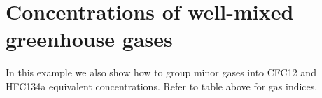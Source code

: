 \documentclass[letterpaper,10pt,english]{sphinxmanual}
\begin{document}
\begin{sphinxVerbatim}[commandchars=\\\{\}]
\end{sphinxVerbatim}

\noindent{}


\section{Concentrations of well-mixed greenhouse gases}
\label{\detokenize{examples:concentrations-of-well-mixed-greenhouse-gases}}
In this example we also show how to group minor gases into CFC12 and
HFC134a equivalent concentrations. Refer to table above for gas indices.
\end{document}
